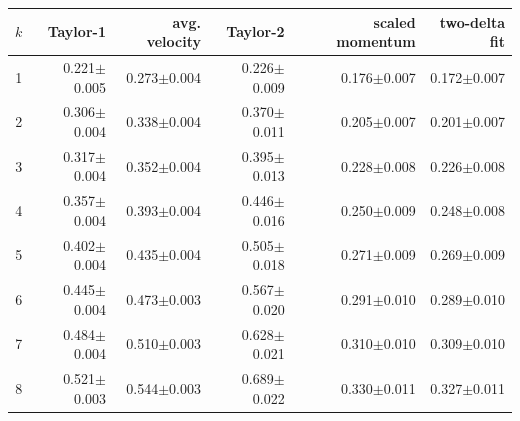 \begin{tabular}{@{}crrrrr@{}}
\toprule
$k$ & Taylor-1 & avg. velocity & Taylor-2 & scaled momentum & two-delta fit \\
\midrule
1 & 0.221$\pm$0.005 & 0.273$\pm$0.004 & 0.226$\pm$0.009 & 0.176$\pm$0.007 & 0.172$\pm$0.007 \\
2 & 0.306$\pm$0.004 & 0.338$\pm$0.004 & 0.370$\pm$0.011 & 0.205$\pm$0.007 & 0.201$\pm$0.007 \\
3 & 0.317$\pm$0.004 & 0.352$\pm$0.004 & 0.395$\pm$0.013 & 0.228$\pm$0.008 & 0.226$\pm$0.008 \\
4 & 0.357$\pm$0.004 & 0.393$\pm$0.004 & 0.446$\pm$0.016 & 0.250$\pm$0.009 & 0.248$\pm$0.008 \\
5 & 0.402$\pm$0.004 & 0.435$\pm$0.004 & 0.505$\pm$0.018 & 0.271$\pm$0.009 & 0.269$\pm$0.009 \\
6 & 0.445$\pm$0.004 & 0.473$\pm$0.003 & 0.567$\pm$0.020 & 0.291$\pm$0.010 & 0.289$\pm$0.010 \\
7 & 0.484$\pm$0.004 & 0.510$\pm$0.003 & 0.628$\pm$0.021 & 0.310$\pm$0.010 & 0.309$\pm$0.010 \\
8 & 0.521$\pm$0.003 & 0.544$\pm$0.003 & 0.689$\pm$0.022 & 0.330$\pm$0.011 & 0.327$\pm$0.011 \\
\bottomrule
\end{tabular}
